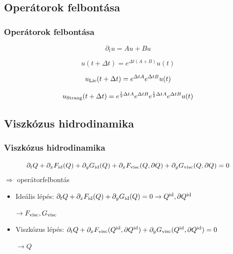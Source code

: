 \documentclass{beamer}
\begin{document}
\subsection{Operátorok felbontása}
\begin{frame}
\frametitle{Operátorok felbontása}
\begin{large}
\begin{equation*}
\partial_t u = Au+Bu
\end{equation*}

\begin{equation*}
u(t+\Delta t)=e^{\Delta t(A+B)}u(t)
\end{equation*}


\begin{equation*}
u_{\rm{Lie}}(t+\Delta t)=e^{\Delta tA}e^{\Delta tB}u(t)
\end{equation*}

\begin{equation*}
u_{\rm{Strang}}(t+\Delta t)=e^{\frac{1}{2}\Delta tA}e^{\Delta tB}e^{\frac{1}{2}\Delta tA}e^{\Delta tB}u(t)
\end{equation*}
\end{large}
\end{frame}

\subsection{Viszkózus hidrodinamika}
\begin{frame}
\frametitle{Viszkózus hidrodinamika}
\begin{equation*}
\partial_t Q + \partial_x F_{\rm id}(Q)+\partial_y G_{\rm id}(Q)+\partial_x F_{\rm visc}(Q,\partial Q)+\partial_y G_{\rm visc}(Q,\partial Q) = 0
\end{equation*}
\vspace{10pt}
$\Longrightarrow$ operátorfelbontás
\vspace{10pt}
\begin{itemize}
\setlength{\itemsep}{20pt}
\item<1-> Ideális lépés: $\partial_t Q + \partial_x F_{\rm id}(Q)+\partial_y G_{\rm id}(Q)=0\rightarrow Q^{\rm id},\partial Q^{\rm id}$

$\rightarrow F_{\rm visc}, G_{\rm visc}$ 

\item<1-> Viszkózus lépés: $\partial_t Q + \partial_x F_{\rm visc}(Q^{\rm id},\partial Q^{\rm id})+\partial_y G_{\rm visc}(Q^{\rm id},\partial Q^{\rm id}) = 0$ 

$\rightarrow Q$ 

\end{itemize}
\end{frame}
\end{document}
